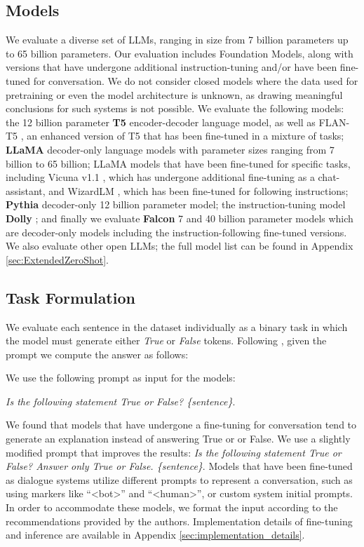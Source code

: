 \documentclass[11pt]{article}
\begin{document}
\subsection{Models} \label{sec:Models}
We evaluate a diverse set of LLMs, ranging in size from 7 billion parameters up to 65 billion parameters. Our evaluation includes Foundation Models, along with versions that have undergone additional instruction-tuning and/or have been fine-tuned for conversation. We do not consider closed models where the data used for pretraining or even the model architecture is unknown, as drawing meaningful conclusions for such systems is not possible. We evaluate the following models: 
the 12 billion parameter \textbf{T5} \cite{DBLP:journals/jmlr/RaffelSRLNMZLL20} encoder-decoder language model, as well as FLAN-T5 \cite{DBLP:journals/corr/abs-2210-11416}, an enhanced version of T5 that has been fine-tuned in a mixture of tasks; 
\textbf{LLaMA} \cite{DBLP:journals/corr/abs-2302-13971} decoder-only language models with parameter sizes ranging from 7 billion to 65 billion; LLaMA models that have been fine-tuned for specific tasks, including Vicuna v1.1 \cite{vicuna2023}, which has undergone additional fine-tuning as a chat-assistant, and WizardLM \cite{DBLP:journals/corr/abs-2304-12244}, which has been fine-tuned for following instructions; \textbf{Pythia} \cite{DBLP:journals/corr/abs-2304-01373} decoder-only 12 billion parameter model; the instruction-tuning model \textbf{Dolly} \cite{dolly}; and finally we evaluate \textbf{Falcon} \cite{falcon40b} 7 and 40 billion parameter models which are decoder-only models including the instruction-following fine-tuned versions. We also evaluate other open LLMs; the full model list can be found in Appendix \ref{sec:ExtendedZeroShot}.


\subsection{Task Formulation}
We evaluate each sentence in the dataset individually as a binary task in which the model must generate either \textit{True} or \textit{False} tokens. Following \citet{DBLP:journals/corr/abs-2303-16755}, given the prompt  we compute the answer  as follows:





We use the following prompt as input for the models: \begin{center}
    \textit{Is the following statement True or False? \{sentence\}}. 
\end{center}
We found that models that have undergone a fine-tuning for conversation tend to generate an explanation instead of answering True or or False. We use a slightly modified prompt that improves the results: \textit{Is the following statement True or False? Answer only True or False. \{sentence\}}. Models that have been fine-tuned as dialogue systems utilize different prompts to represent a conversation, such as using markers like ``<bot>'' and ``<human>'', or custom system initial prompts. In order to accommodate these models, we format the input according to the recommendations provided by the authors. Implementation details of fine-tuning and inference are available in Appendix \ref{sec:implementation_details}.
\end{document}
